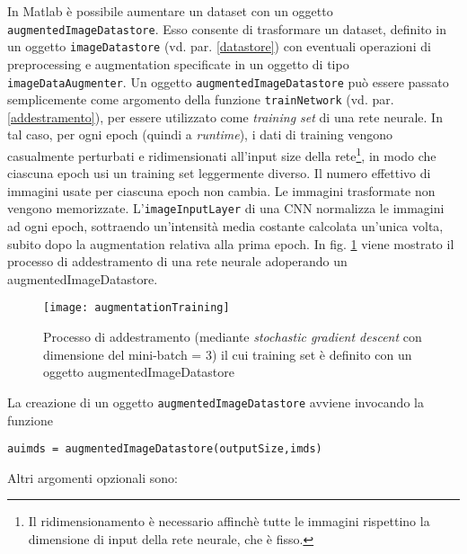 In Matlab è possibile aumentare un dataset con un oggetto \verb|augmentedImageDatastore|. Esso consente di trasformare un dataset, definito in un oggetto \verb|imageDatastore| (vd. par. \ref{datastore}) con eventuali operazioni di preprocessing e augmentation specificate in un oggetto di tipo \verb|imageDataAugmenter|.
Un oggetto \verb|augmentedImageDatastore| può essere passato semplicemente come argomento della funzione \verb|trainNetwork| (vd. par. \ref{addestramento}), per essere utilizzato come \textit{training set} di una rete neurale. In tal caso, per ogni epoch (quindi a \textit{runtime}), i dati di training vengono casualmente perturbati e ridimensionati all'input size della rete\footnote{Il ridimensionamento è necessario affinchè tutte le immagini rispettino la dimensione di input della rete neurale, che è fisso.}, in modo che ciascuna epoch usi un training set leggermente diverso. Il numero effettivo di immagini usate per ciascuna epoch non cambia. Le immagini trasformate non vengono memorizzate. L'\verb|imageInputLayer| di una CNN normalizza le immagini ad ogni epoch, sottraendo un'intensità media costante calcolata un'unica volta, subito dopo la augmentation relativa alla prima epoch. In fig. \ref{fig:augmentationTraining} viene mostrato il processo di addestramento di una rete neurale adoperando un augmentedImageDatastore.\\

\begin{figure}[h]
\centering
\texttt{[image: augmentationTraining]}
\caption{Processo di addestramento (mediante \textit{stochastic gradient descent} con dimensione del mini-batch = 3) il cui training set è definito con un oggetto augmentedImageDatastore}
\label{fig:augmentationTraining}
\end{figure}

La creazione di un oggetto \verb|augmentedImageDatastore| avviene invocando la funzione

\begin{verbatim}
auimds = augmentedImageDatastore(outputSize,imds)
\end{verbatim}

Altri argomenti opzionali sono:

